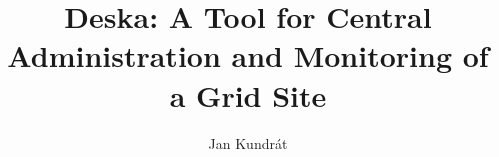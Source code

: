 \documentclass{book}
\begin{document}
\title{Deska: A Tool for Central Administration and Monitoring of a Grid Site}

\author{Jan Kundrát}

\maketitle

\setcounter{tocdepth}{3}
\tableofcontents




%
\end{document}
